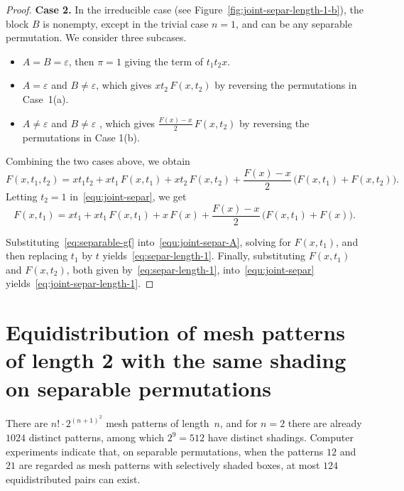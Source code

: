 \documentclass[10pt,a4paper]{article}
\begin{document}
\begin{proof}
\noindent \textbf{Case 2.}  In the irreducible case (see Figure~\ref{fig:joint-separ-length-1-b}), the block $B$ is nonempty, except in the trivial case $n=1$, and can be any separable permutation. We consider three subcases.

\begin{itemize}
	\item[(a)] $A=B=\varepsilon$, then  $\pi=1$ giving the term of  $t_1t_2x$.

	\item[(b)] $A = \varepsilon$ and $B \neq \varepsilon$, which gives $xt_2\,F(x,t_2)$ by reversing the permutations in Case~1(a).	
	\item[(c)]$A \neq \varepsilon$ and $B \neq \varepsilon$ , which gives $\frac{F(x) - x}{2}\, F(x,t_2)$ by reversing the permutations in Case 1(b).
	
\end{itemize}
	Combining the two cases above, we obtain
\begin{equation}\label{equ:joint-separ}
	F(x,t_1,t_2) = x t_1 t_2 + x t_1\, F(x,t_1) + x t_2\, F(x,t_2) + \frac{F(x) - x}{2}\, \big(F(x,t_1) + F(x,t_2)\big).
\end{equation}
Letting $t_2=1$ in~\eqref{equ:joint-separ}, we get
\begin{equation}\label{equ:joint-separ-A}
	F(x,t_1) = x t_1 + x t_1\, F(x,t_1) + x \, F(x) + \frac{F(x) - x}{2}\, \big(F(x,t_1) + F(x)\big).
\end{equation}

Substituting~\eqref{eq:separable-gf} into~\eqref{equ:joint-separ-A}, solving for $F(x,t_1)$,
and then replacing $t_1$ by $t$ yields~\eqref{eq:separ-length-1}.
Finally, substituting $F(x,t_1)$ and $F(x,t_2)$, both given by~\eqref{eq:separ-length-1},
into~\eqref{equ:joint-separ} yields~\eqref{eq:joint-separ-length-1}.\end{proof}

\section{Equidistribution of mesh patterns of length 2 with the same shading on separable permutations} \label{section:3}

There are $n!\cdot 2^{(n+1)^2}$ mesh patterns of length~$n$, and for $n=2$ there are already $1024$ distinct patterns, among which $2^{9}=512$ have distinct shadings. Computer experiments indicate that, on separable permutations, when the patterns $12$ and $21$ are regarded as mesh patterns with selectively shaded boxes, at most $124$ equidistributed pairs can exist.
\end{document}
